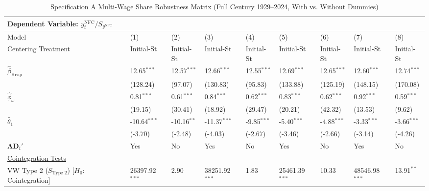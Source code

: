 \begin{landscape}
\begin{table}[H]
\centering
\caption{Specification A Multi-Wage Share Robustness Matrix (Full Century 1929--2024, With vs. Without Dummies)}
\label{tab:specA_wageshares}
\small
\begin{tabular}{p{5.2cm}p{1.5cm}p{1.5cm}p{1.5cm}p{1.5cm}p{1.5cm}p{1.5cm}p{1.5cm}p{1.5cm}}
\toprule
\multicolumn{9}{l}{\textbf{Dependent Variable: $y_t^{\text{NFC}} / S_{y^{\text{NFC}}}$}} \\
\midrule
Model & (1) & (2) & (3) & (4) & (5) & (6) & (7) & (8)  \\
Centering Treatment & Initial-St & Initial-St & Initial-St & Initial-St & Initial-St & Initial-St & Initial-St & Initial-St  \\
\midrule
$\hat{\beta}_{\text{Kcap}}$ & 12.65$^{***}$ & 12.57$^{***}$ & 12.66$^{***}$ & 12.55$^{***}$ & 12.69$^{***}$ & 12.65$^{***}$ & 12.60$^{***}$ & 12.74$^{***}$  \\
 & {\scriptsize (128.24)} & {\scriptsize (97.07)} & {\scriptsize (130.83)} & {\scriptsize (95.83)} & {\scriptsize (133.88)} & {\scriptsize (125.19)} & {\scriptsize (148.15)} & {\scriptsize (170.08)}  \\
$\hat{\phi}_{\omega}$ & 0.81$^{***}$ & 0.61$^{***}$ & 0.84$^{***}$ & 0.62$^{***}$ & 0.83$^{***}$ & 0.62$^{***}$ & 0.92$^{***}$ & 0.59$^{***}$  \\
 & {\scriptsize (19.15)} & {\scriptsize (30.41)} & {\scriptsize (18.92)} & {\scriptsize (29.47)} & {\scriptsize (20.21)} & {\scriptsize (42.32)} & {\scriptsize (13.53)} & {\scriptsize (9.62)}  \\
$\hat{\theta}_{1}$ & -10.64$^{***}$ & -10.16$^{**}$ & -11.37$^{***}$ & -9.85$^{***}$ & -5.40$^{***}$ & -4.88$^{***}$ & -3.33$^{***}$ & -3.66$^{***}$  \\
 & {\scriptsize (-3.70)} & {\scriptsize (-2.48)} & {\scriptsize (-4.03)} & {\scriptsize (-2.67)} & {\scriptsize (-3.46)} & {\scriptsize (-2.66)} & {\scriptsize (-3.14)} & {\scriptsize (-4.26)}  \\
$\boldsymbol{\Lambda} \mathbf{D}_t'$ & Yes & No & Yes & No & Yes & No & Yes & No  \\
\midrule
\multicolumn{9}{l}{\underline{Cointegration Tests}} \\
\makecell[l]{VW Type 2 ($S_{\text{Type 2}}$) \\ {\scriptsize [$H_0$: Cointegration]}} & 26397.92$^{***}$ & 2.90 & 38251.92$^{***}$ & 1.83 & 25461.39$^{***}$ & 10.33 & 48546.98$^{***}$ & 13.91$^{**}$  \\

\end{tabular}
\end{table}
\end{landscape}
